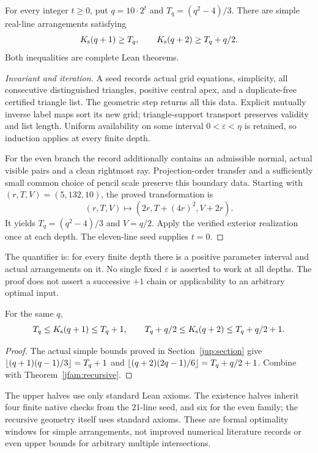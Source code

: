 \begin{theorem}\label{jfam:recursive}
For every integer $t\ge0$, put $q=10\cdot2^t$ and $T_q=(q^2-4)/3$. There are simple real-line arrangements satisfying
\begin{equation}\label{jfam:families}
 K_{\mathrm s}(q+1)\ge T_q,\qquad K_{\mathrm s}(q+2)\ge T_q+q/2.
\end{equation}
Both inequalities are complete Lean theorems.
\end{theorem}
\begin{proof}[Invariant and iteration]
A seed records actual grid equations, simplicity, all consecutive distinguished triangles, positive central apex, and a duplicate-free certified triangle list. The geometric step returns all this data. Explicit mutually inverse label maps sort its new grid; triangle-support transport preserves validity and list length. Uniform availability on some interval $0<\varepsilon<\eta$ is retained, so induction applies at every finite depth.

For the even branch the record additionally contains an admissible normal, actual visible pairs and a clean rightmost ray. Projection-order transfer and a sufficiently small common choice of pencil scale preserve this boundary data. Starting with $(r,T,V)=(5,132,10)$, the proved transformation is
\[
 (r,T,V)\longmapsto(2r,T+(4r)^2,V+2r).
\]
It yields $T_q=(q^2-4)/3$ and $V=q/2$. Apply the verified exterior realization once at each depth. The eleven-line seed supplies $t=0$.
\end{proof}
The quantifier is: for every finite depth there is a positive parameter interval and actual arrangements on it. No single fixed $\varepsilon$ is asserted to work at all depths. The proof does not assert a successive $+1$ chain or applicability to an arbitrary optimal input.

\begin{theorem}\label{jfam:windows}
For the same $q$,
\[
 T_q\le K_{\mathrm s}(q+1)\le T_q+1,\qquad
 T_q+q/2\le K_{\mathrm s}(q+2)\le T_q+q/2+1.
\]
\end{theorem}
\begin{proof}
The actual simple bounds proved in Section~\ref{jup:section} give
$\left\lfloor(q+1)(q-1)/3\right\rfloor=T_q+1$ and
$\left\lfloor(q+2)(2q-1)/6\right\rfloor=T_q+q/2+1$.
Combine with Theorem~\ref{jfam:recursive}.
\end{proof}
The upper halves use only standard Lean axioms. The existence halves inherit four finite native checks from the 21-line seed, and six for the even family; the recursive geometry itself uses standard axioms. These are formal optimality windows for simple arrangements, not improved numerical literature records or even upper bounds for arbitrary multiple intersections.


